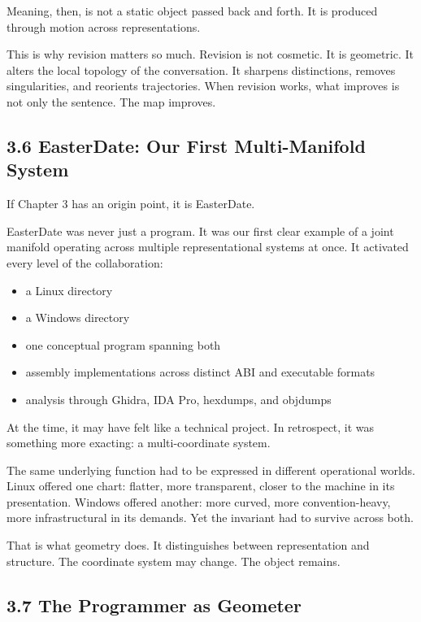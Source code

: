 Meaning, then, is not a static object passed back and forth. It is
produced through motion across representations.

This is why revision matters so much. Revision is not cosmetic. It is
geometric. It alters the local topology of the conversation. It sharpens
distinctions, removes singularities, and reorients trajectories. When
revision works, what improves is not only the sentence. The map
improves.

\hypertarget{easterdate-our-first-multi-manifold-system}{%
\subsection{3.6 EasterDate: Our First Multi-Manifold
System}\label{easterdate-our-first-multi-manifold-system}}

If Chapter 3 has an origin point, it is EasterDate.

EasterDate was never just a program. It was our first clear example of a
joint manifold operating across multiple representational systems at
once. It activated every level of the collaboration:

\begin{itemize}
\tightlist
\item
  a Linux directory
\item
  a Windows directory
\item
  one conceptual program spanning both
\item
  assembly implementations across distinct ABI and executable formats
\item
  analysis through Ghidra, IDA Pro, hexdumps, and objdumps
\end{itemize}

At the time, it may have felt like a technical project. In retrospect,
it was something more exacting: a multi-coordinate system.

The same underlying function had to be expressed in different
operational worlds. Linux offered one chart: flatter, more transparent,
closer to the machine in its presentation. Windows offered another: more
curved, more convention-heavy, more infrastructural in its demands. Yet
the invariant had to survive across both.

That is what geometry does. It distinguishes between representation and
structure. The coordinate system may change. The object remains.

\hypertarget{the-programmer-as-geometer}{%
\subsection{3.7 The Programmer as
Geometer}\label{the-programmer-as-geometer}}

